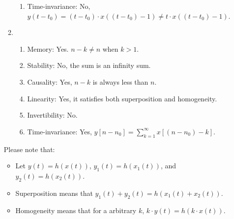 \documentclass[10pt,a4paper, margin=1in]{article}
\begin{document}
\begin{enumerate}
\begin{enumerate}
\begin{enumerate}
        \item Time-invariance: No, $y(t - t_0) = (t - t_0) \cdot x((t - t_0) - 1) \not = t \cdot x((t - t_0) - 1)$.
        \end{enumerate}%
    \item 
        \begin{enumerate}
        \item Memory: Yes. $n-k \not = n $ when $k>1$.
        \item Stability: No, the sum is an infinity sum.
        \item Causality: Yes, $n-k$ is always less than $n$.
        \item Linearity: Yes, it satisfies both superposition and homogeneity.
        \item Invertibility: No. %
        \item Time-invariance: Yes, $y[n - n_0] = \sum_{k  =1}^{\infty} x[(n - n_0) - k]$.
        \end{enumerate}%
    \end{enumerate}
    
    Please note that:
    \begin{itemize}
        \item Let $y(t) = h(x(t))$, $y_1(t) = h(x_1(t))$, and $y_2(t) = h(x_2(t))$.
        \item Superposition means that $y_1(t) + y_2(t) = h(x_1(t) + x_2(t))$.
        \item Homogeneity means that for a arbitrary $k$, $k \cdot y(t) = h(k \cdot x(t))$.
    \end{itemize}
    
\end{enumerate}
\end{document}
